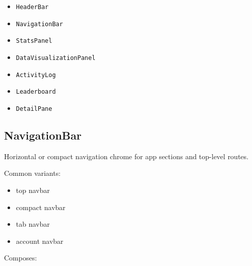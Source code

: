 \begin{itemize}
\tightlist
\item
  \texttt{H\allowbreak{}e\allowbreak{}a\allowbreak{}d\allowbreak{}e\allowbreak{}r\allowbreak{}B\allowbreak{}a\allowbreak{}r}
\item
  \texttt{N\allowbreak{}a\allowbreak{}v\allowbreak{}i\allowbreak{}g\allowbreak{}a\allowbreak{}t\allowbreak{}i\allowbreak{}o\allowbreak{}n\allowbreak{}B\allowbreak{}a\allowbreak{}r}
\item
  \texttt{S\allowbreak{}t\allowbreak{}a\allowbreak{}t\allowbreak{}s\allowbreak{}P\allowbreak{}a\allowbreak{}n\allowbreak{}e\allowbreak{}l}
\item
  \texttt{D\allowbreak{}a\allowbreak{}t\allowbreak{}a\allowbreak{}V\allowbreak{}i\allowbreak{}s\allowbreak{}u\allowbreak{}a\allowbreak{}l\allowbreak{}i\allowbreak{}z\allowbreak{}a\allowbreak{}t\allowbreak{}i\allowbreak{}o\allowbreak{}n\allowbreak{}P\allowbreak{}a\allowbreak{}n\allowbreak{}e\allowbreak{}l}
\item
  \texttt{A\allowbreak{}c\allowbreak{}t\allowbreak{}i\allowbreak{}v\allowbreak{}i\allowbreak{}t\allowbreak{}y\allowbreak{}L\allowbreak{}o\allowbreak{}g}
\item
  \texttt{L\allowbreak{}e\allowbreak{}a\allowbreak{}d\allowbreak{}e\allowbreak{}r\allowbreak{}b\allowbreak{}o\allowbreak{}a\allowbreak{}r\allowbreak{}d}
\item
  \texttt{D\allowbreak{}e\allowbreak{}t\allowbreak{}a\allowbreak{}i\allowbreak{}l\allowbreak{}P\allowbreak{}a\allowbreak{}n\allowbreak{}e}
\end{itemize}

\subsection{NavigationBar}\label{record-128-navigationbar}

Horizontal or compact navigation chrome for app sections and top-level routes.

Common variants:

\begin{itemize}
\tightlist
\item
  top navbar
\item
  compact navbar
\item
  tab navbar
\item
  account navbar
\end{itemize}

Composes:

